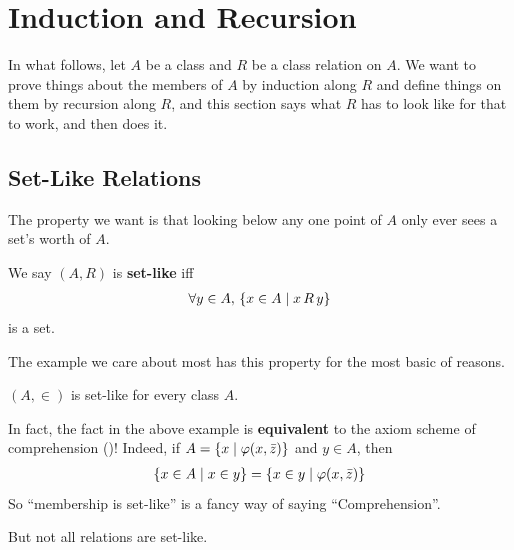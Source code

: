 \section{Induction and Recursion}

In what follows, let $A$ be a class and $R$ be a class relation on $A$. We want to prove things about the members of $A$ by induction along $R$ and define things on them by recursion along $R$, and this section says what $R$ has to look like for that to work, and then does it.

\subsection{Set-Like Relations}

The property we want is that looking below any one point of $A$ only ever sees a set's worth of $A$.

\begin{boxdefinition}
    We say $(A, R)$ is \textbf{set-like} iff
    \begin{align*}
        \forall y \in A, \, \left\{ x \in A \; \middle\vert \; x \, R \, y \right\}
    \end{align*}
    is a set.
\end{boxdefinition}

The example we care about most has this property for the most basic of reasons.

\begin{boxexample}[Membership]
    $(A, \in)$ is set-like for every class $A$.
\end{boxexample}

In fact, the fact in the above example is \textbf{equivalent} to the axiom scheme of comprehension ()! Indeed, if $A = \left\{ x \; \middle\vert \; \varphi\!\left( x, \bar{z} \right) \right\}$ and $y \in A$, then
\begin{align*}
    \left\{ x \in A \; \middle\vert \; x \in y \right\} = \left\{ x \in y \; \middle\vert \; \varphi\!\left( x, \bar{z} \right) \right\}
\end{align*}
So ``membership is set-like'' is a fancy way of saying ``Comprehension''.

But not all relations are set-like.

